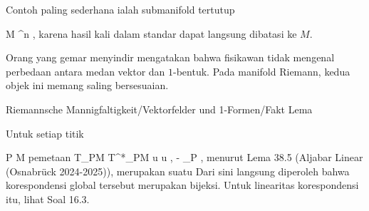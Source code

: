 Contoh paling sederhana ialah submanifold tertutup

\mavergleichskette
{\vergleichskette
{M
}
{ \subseteq }{ \R^n
}
{  }{
}
{    }{
}
{   }{
}
}
{}{}{,}
karena hasil kali dalam standar dapat langsung dibatasi ke $M$.


Orang yang gemar menyindir mengatakan bahwa fisikawan tidak mengenal perbedaan antara medan vektor dan $1$-bentuk. Pada manifold Riemann, kedua objek ini memang saling bersesuaian.


{Riemannsche Mannigfaltigkeit/Vektorfelder und 1-Formen/Fakt}
{Lema}
{}
{

\faktzusatz {}
\faktzusatz {}

}
{

Untuk setiap titik

\mavergleichskette
{\vergleichskette
{P
}
{ \in }{ M
}
{  }{
}
{    }{
}
{   }{
}
}
{}{}{}
pemetaan
\maabbeledisp {} {T_PM} {T^*_PM
} { u } { \left\langle  u  ,  -  \right\rangle_P
} {,}
menurut
Lema 38.5 (Aljabar Linear (Osnabrück 2024-2025)),
merupakan suatu
Dari sini langsung diperoleh bahwa korespondensi global tersebut merupakan bijeksi. Untuk linearitas korespondensi itu, lihat
Soal 16.3.

}

